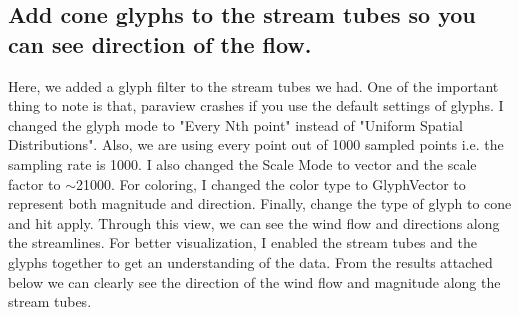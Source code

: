\documentclass[a4paper,11pt]{article}
\theoremstyle{mytheor}
\begin{document}
\clearpage

\subsection{Add cone glyphs to the stream tubes so you can see direction of the flow.}
Here, we added a glyph filter to the stream tubes we had. One of the important thing to note is that, paraview crashes if you use the default settings of glyphs. I changed the glyph mode to "Every Nth point" instead of "Uniform Spatial Distributions". Also, we are using every point out of 1000 sampled points i.e. the sampling rate is 1000. I also changed the Scale Mode to vector and the scale factor to $\sim$21000. For coloring, I changed the color type to GlyphVector to represent both magnitude and direction. Finally, change the type of glyph to cone and hit apply. Through this view, we can see the wind flow and directions along the streamlines. For better visualization, I enabled the stream tubes and the glyphs together to get an understanding of the data. From the results attached below we can clearly see the direction of the wind flow and magnitude along the stream tubes. 
\end{document}
